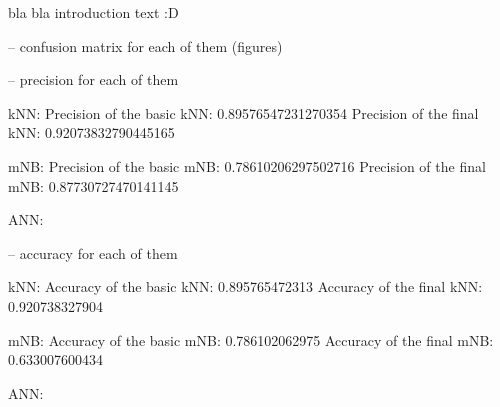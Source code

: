 bla bla introduction text :D


-- confusion matrix for each of them (figures)



-- precision for each of them

kNN:
Precision of the basic kNN: 0.89576547231270354
Precision of the final kNN: 0.92073832790445165

mNB:
Precision of the basic mNB: 0.78610206297502716
Precision of the final mNB: 0.87730727470141145

ANN:


-- accuracy for each of them

kNN:
Accuracy of the basic kNN: 0.895765472313
Accuracy of the final kNN: 0.920738327904

mNB:
Accuracy of the basic mNB: 0.786102062975
Accuracy of the final mNB: 0.633007600434

ANN:
